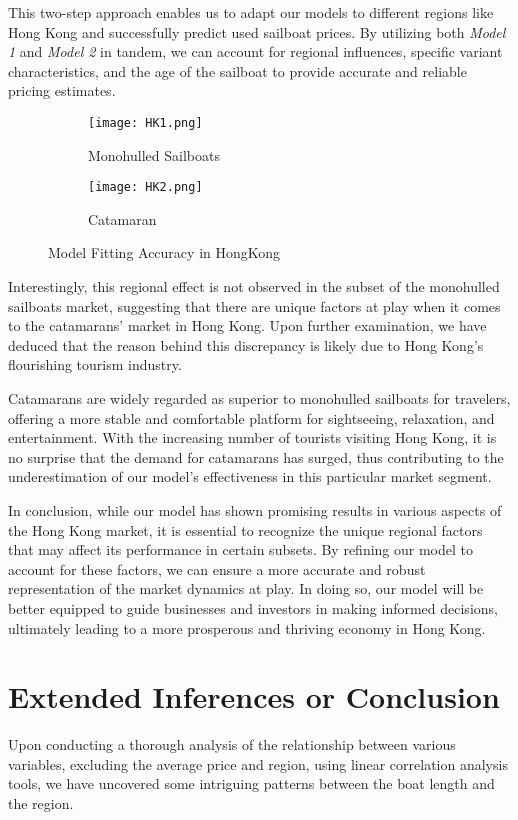 \documentclass[12pt]{article}  %
\begin{document}
This two-step approach enables us to adapt our models to different regions like Hong Kong and successfully predict used sailboat prices. 
By utilizing both \emph{Model 1} and \emph{Model 2} in tandem, we can account for regional influences, specific variant characteristics, 
and the age of the sailboat to provide accurate and reliable pricing estimates.

\begin{figure}[htbp]
    \centering
    \begin{subfigure}[b]{.4\textwidth}
    \texttt{[image: HK1.png]}
    \caption{Monohulled Sailboats}\label{subfig:HK1}
    \end{subfigure}
    \begin{subfigure}[b]{.4\textwidth}
    \texttt{[image: HK2.png]}
    \caption{Catamaran}\label{subfig:HK2}
    \end{subfigure}
    \caption{Model Fitting Accuracy in HongKong}\label{fig:HK}
\end{figure} 

Interestingly, this regional effect is not observed in the subset of the monohulled sailboats market, suggesting that there are unique factors at play when it comes to the catamarans' market in Hong Kong. Upon further examination, we have deduced that the reason behind this discrepancy is likely due to Hong Kong's flourishing tourism industry.

Catamarans are widely regarded as superior to monohulled sailboats for travelers, offering a more stable and comfortable platform for sightseeing, relaxation, and entertainment. With the increasing number of tourists visiting Hong Kong, it is no surprise that the demand for catamarans has surged, thus contributing to the underestimation of our model's effectiveness in this particular market segment.

In conclusion, while our model has shown promising results in various aspects of the Hong Kong market, it is essential to recognize the unique regional factors that may affect its performance in certain subsets. By refining our model to account for these factors, we can ensure a more accurate and robust representation of the market dynamics at play. In doing so, our model will be better equipped to guide businesses and investors in making informed decisions, ultimately leading to a more prosperous and thriving economy in Hong Kong.


\section{Extended Inferences or Conclusion}
Upon conducting a thorough analysis of the relationship between various variables, excluding the average price and region, using linear correlation analysis tools, we have uncovered some intriguing patterns between the boat length and the region.
\end{document}
